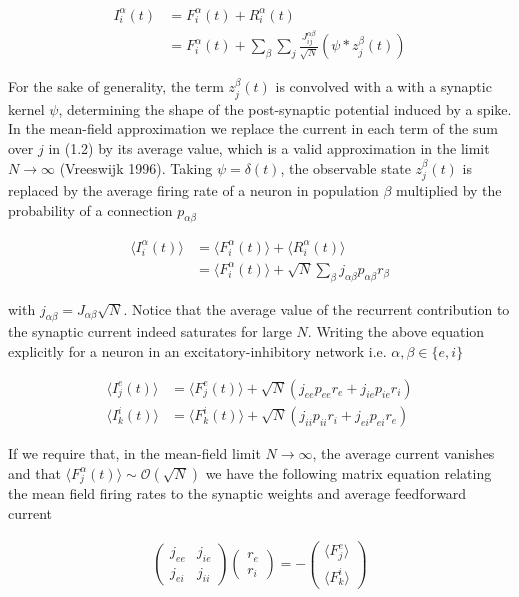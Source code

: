 \documentclass{ucetd}
\begin{document}
\begin{align}
I_{i}^{\alpha}(t) &= F_{i}^{\alpha}(t) + R_{i}^{\alpha}(t)\\
&= F_{i}^{\alpha}(t) + \sum_{\beta}\sum_{j} \frac{J_{ij}^{\alpha\beta}}{\sqrt{N}}(\psi * z^{\beta}_{j}(t))
\end{align}

For the sake of generality, the term $z^{\beta}_{j}(t)$ is convolved with a with a synaptic kernel $\psi$, determining the shape of the post-synaptic potential induced by a spike. In the mean-field approximation we replace the current in each term of the sum over $j$ in (1.2) by its average value, which is a valid approximation in the limit $N\rightarrow\infty$ (Vreeswijk 1996). Taking $\psi = \delta(t)$, the observable state $z^{\beta}_{j}(t)$ is replaced by the average firing rate of a neuron in population $\beta$ multiplied by the probability of a connection $p_{\alpha\beta}$

\begin{align*}
\langle I_{i}^{\alpha}(t)\rangle &= \langle F_{i}^{\alpha}(t)\rangle + \langle R_{i}^{\alpha}(t)\rangle\\
&= \langle F_{i}^{\alpha}(t)\rangle + \sqrt{N}\sum_{\beta}j_{\alpha\beta}p_{\alpha\beta}r_{\beta}
\end{align*}

with $j_{\alpha\beta} = J_{\alpha\beta}\sqrt{N}$. Notice that the average value of the recurrent contribution to the synaptic current indeed saturates for large $N$. Writing the above equation explicitly for a neuron in an excitatory-inhibitory network i.e. $\alpha, \beta \in \{e, i\}$

\begin{align}
\langle I_{j}^{e}(t)\rangle &= \langle F_{j}^{e}(t)\rangle + \sqrt{N}\left(j_{ee}p_{ee}r_{e} + j_{ie}p_{ie}r_{i}\right)\\
\langle I_{k}^{i}(t)\rangle &= \langle F_{k}^{i}(t)\rangle + \sqrt{N}\left(j_{ii}p_{ii}r_{i} + j_{ei}p_{ei}r_{e}\right)
\end{align}

If we require that, in the mean-field limit $N\rightarrow\infty$, the average current vanishes and that $\langle F_{j}^{\alpha}(t)\rangle \sim \mathcal{O}(\sqrt{N})$ we have the following matrix equation relating the mean field firing rates to the synaptic weights and average feedforward current

\begin{align}
\begin{pmatrix}
j_{ee} & j_{ie}\\
j_{ei} & j_{ii}
\end{pmatrix}
\begin{pmatrix}
r_{e}\\
r_{i}
\end{pmatrix}
= 
-\begin{pmatrix}
\langle F_{j}^{e}\rangle\\
\langle F_{k}^{i}\rangle
\end{pmatrix}
\end{align}
\end{document}
